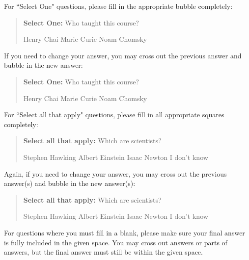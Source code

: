 \documentclass[11pt,addpoints,answers]{exam}
\newcommand{\blackcircle}{\tikz\draw[black,fill=black] (0,0) circle (1ex);}
\begin{document}
For ``Select One" questions, please fill in the appropriate bubble completely:

\begin{quote}
\textbf{Select One:} Who taught this course?
    \begin{checkboxes}
     \CorrectChoice Henry Chai
     \choice Marie Curie
     \choice Noam Chomsky
    \end{checkboxes}
\end{quote}

If you need to change your answer, you may cross out the previous answer and bubble in the new answer:

\begin{quote}
\textbf{Select One:} Who taught this course?
    {
    \begin{checkboxes}
     \CorrectChoice Henry Chai
     \choice Marie Curie \checkboxchar{\xcancel{\blackcircle}{}}
     \choice Noam Chomsky
    \end{checkboxes}
    }
\end{quote}

For ``Select all that apply" questions, please fill in all appropriate squares completely:

\begin{quote}
\textbf{Select all that apply:} Which are scientists?
    {%
    \checkboxchar{$\Box$} \checkedchar{$\blacksquare$} %
    \begin{checkboxes}
    \CorrectChoice Stephen Hawking 
    \CorrectChoice Albert Einstein
    \CorrectChoice Isaac Newton
    \choice I don't know
    \end{checkboxes}
    }
\end{quote}

Again, if you need to change your answer, you may cross out the previous answer(s) and bubble in the new answer(s):

\begin{quote}
\textbf{Select all that apply:} Which are scientists?
    {%
    \checkboxchar{\xcancel{$\blacksquare$}} \checkedchar{$\blacksquare$} %
    \begin{checkboxes}
    \CorrectChoice Stephen Hawking 
    \CorrectChoice Albert Einstein
    \CorrectChoice Isaac Newton
    \choice I don't know
    \end{checkboxes}
    }
\end{quote}

For questions where you must fill in a blank, please make sure your final answer is fully included in the given space. You may cross out answers or parts of answers, but the final answer must still be within the given space.
\end{document}

